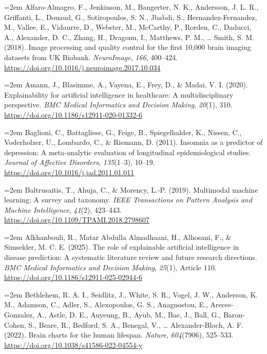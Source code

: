 \documentclass[11pt,a4paper,twoside]{article}
\begin{document}
\hangindent=2em Alfaro-Almagro, F., Jenkinson, M., Bangerter, N. K., Andersson, J. L. R., Griffanti, L., Douaud, G., Sotiropoulos, S. N., Jbabdi, S., Hernandez-Fernandez, M., Vallee, E., Vidaurre, D., Webster, M., McCarthy, P., Rorden, C., Daducci, A., Alexander, D. C., Zhang, H., Dragonu, I., Matthews, P. M., \ldots{} Smith, S. M. (2018). Image processing and quality control for the first 10,000 brain imaging datasets from UK Biobank. \textit{NeuroImage}, \textit{166}, 400--424. \url{https://doi.org/10.1016/j.neuroimage.2017.10.034}

\hangindent=2em Amann, J., Blasimme, A., Vayena, E., Frey, D., \& Madai, V. I. (2020). Explainability for artificial intelligence in healthcare: A multidisciplinary perspective. \textit{BMC Medical Informatics and Decision Making}, \textit{20}(1), 310. \url{https://doi.org/10.1186/s12911-020-01332-6}

\hangindent=2em Baglioni, C., Battagliese, G., Feige, B., Spiegelhalder, K., Nissen, C., Voderholzer, U., Lombardo, C., \& Riemann, D. (2011). Insomnia as a predictor of depression: A meta-analytic evaluation of longitudinal epidemiological studies. \textit{Journal of Affective Disorders}, \textit{135}(1--3), 10--19. \url{https://doi.org/10.1016/j.jad.2011.01.011}

\hangindent=2em Baltrusaitis, T., Ahuja, C., \& Morency, L.-P. (2019). Multimodal machine learning: A survey and taxonomy. \textit{IEEE Transactions on Pattern Analysis and Machine Intelligence}, \textit{41}(2), 423--443. \url{https://doi.org/10.1109/TPAMI.2018.2798607}

\hangindent=2em Alkhanbouli, R., Matar Abdulla Almadhaani, H., Alhosani, F., \& Simsekler, M. C. E. (2025). The role of explainable artificial intelligence in disease prediction: A systematic literature review and future research directions. \textit{BMC Medical Informatics and Decision Making}, \textit{25}(1), Article 110. \url{https://doi.org/10.1186/s12911-025-02944-6}

\hangindent=2em Bethlehem, R. A. I., Seidlitz, J., White, S. R., Vogel, J. W., Anderson, K. M., Adamson, C., Adler, S., Alexopoulos, G. S., Anagnostou, E., Areces-Gonzalez, A., Astle, D. E., Auyeung, B., Ayub, M., Bae, J., Ball, G., Baron-Cohen, S., Beare, R., Bedford, S. A., Benegal, V., \ldots{} Alexander-Bloch, A. F. (2022). Brain charts for the human lifespan. \textit{Nature}, \textit{604}(7906), 525--533. \url{https://doi.org/10.1038/s41586-022-04554-y}
\end{document}
